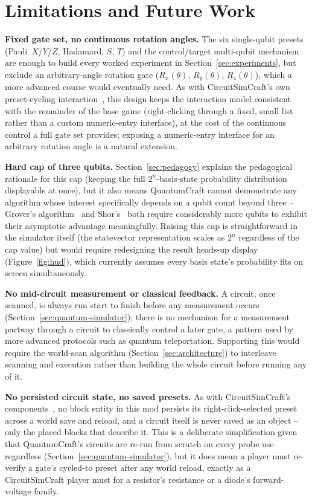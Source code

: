 \section{Limitations and Future Work}
\label{sec:limitations}

\textbf{Fixed gate set, no continuous rotation angles.} The six single-qubit presets
(Pauli~$X$/$Y$/$Z$, Hadamard, $S$, $T$) and the control/target multi-qubit mechanism are
enough to build every worked experiment in Section~\ref{sec:experiments}, but exclude an
arbitrary-angle rotation gate ($R_x(\theta)$, $R_y(\theta)$, $R_z(\theta)$), which a more
advanced course would eventually need. As with CircuitSimCraft's own preset-cycling
interaction~\cite{picos2026circuitsimcraft}, this design keeps the interaction model consistent
with the remainder of the base game (right-clicking through a fixed, small list rather than a
custom numeric-entry interface), at the cost of the continuous control a full gate set
provides; exposing a numeric-entry interface for an arbitrary rotation angle is a natural
extension.

\textbf{Hard cap of three qubits.} Section~\ref{sec:pedagogy} explains the pedagogical
rationale for this cap (keeping the full $2^n$-basis-state probability distribution
displayable at once), but it also means QuantumCraft cannot demonstrate any algorithm whose
interest specifically depends on a qubit count beyond three -- Grover's
algorithm~\cite{grover1996fast} and Shor's~\cite{shor1997polynomial} both require considerably
more qubits to exhibit their asymptotic advantage meaningfully. Raising this cap is
straightforward in the simulator itself (the statevector representation scales as $2^n$
regardless of the cap value) but would require redesigning the result heads-up display
(Figure~\ref{fig:hud}), which currently assumes every basis state's probability fits on
screen simultaneously.

\textbf{No mid-circuit measurement or classical feedback.} A circuit, once scanned, is always
run start to finish before any measurement occurs (Section~\ref{sec:quantum-simulator}); there
is no mechanism for a measurement partway through a circuit to classically control a later
gate, a pattern used by more advanced protocols such as quantum teleportation. Supporting this
would require the world-scan algorithm (Section~\ref{sec:architecture}) to interleave scanning
and execution rather than building the whole circuit before running any of it.

\textbf{No persisted circuit state, no saved presets.} As with CircuitSimCraft's
components~\cite{picos2026circuitsimcraft}, no block entity in this mod persists its
right-click-selected preset across a world save and reload, and a circuit itself is never
saved as an object -- only the placed blocks that describe it. This is a deliberate
simplification given that QuantumCraft's circuits are re-run from scratch on every probe use
regardless (Section~\ref{sec:quantum-simulator}), but it does mean a player must re-verify a
gate's cycled-to preset after any world reload, exactly as a CircuitSimCraft player must for a
resistor's resistance or a diode's forward-voltage family.

